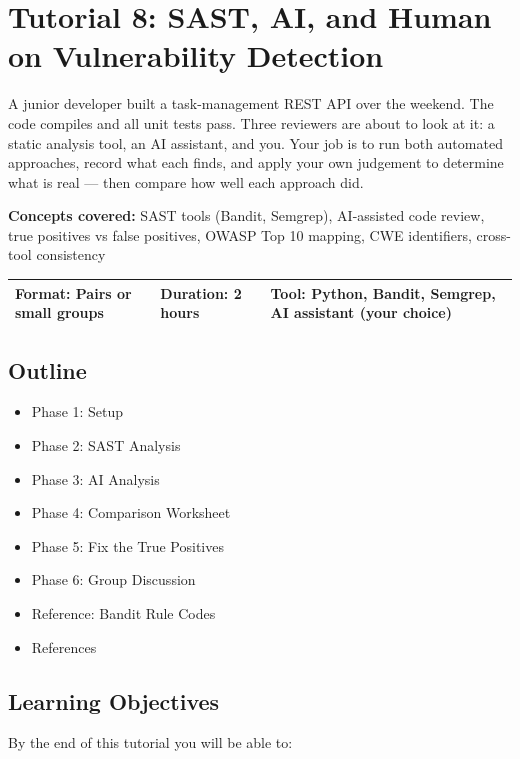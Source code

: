 \documentclass[11pt,a4paper]{book}
\begin{document}

\chapter{Tutorial 8: SAST, AI, and Human on Vulnerability Detection}

A junior developer built a task-management REST API over the weekend. The code compiles and all unit tests pass. Three reviewers are about to look at it: a static analysis tool, an AI assistant, and you. Your job is to run both automated approaches, record what each finds, and apply your own judgement to determine what is real --- then compare how well each approach did.

\textbf{Concepts covered:} SAST tools (Bandit, Semgrep), AI-assisted code review, true positives vs false positives, OWASP Top 10 mapping, CWE identifiers, cross-tool consistency

\begin{tabular}{lll}
\hline
\textbf{Format:} Pairs or small groups & \textbf{Duration:} 2 hours & \textbf{Tool:} Python, Bandit, Semgrep, AI assistant (your choice) \\
\hline
\end{tabular}

\medskip

\section{Outline}

\begin{itemize}
  \item Phase 1: Setup
  \item Phase 2: SAST Analysis
  \item Phase 3: AI Analysis
  \item Phase 4: Comparison Worksheet
  \item Phase 5: Fix the True Positives
  \item Phase 6: Group Discussion
  \item Reference: Bandit Rule Codes
  \item References
\end{itemize}

\medskip

\section{Learning Objectives}

By the end of this tutorial you will be able to:
\end{document}
